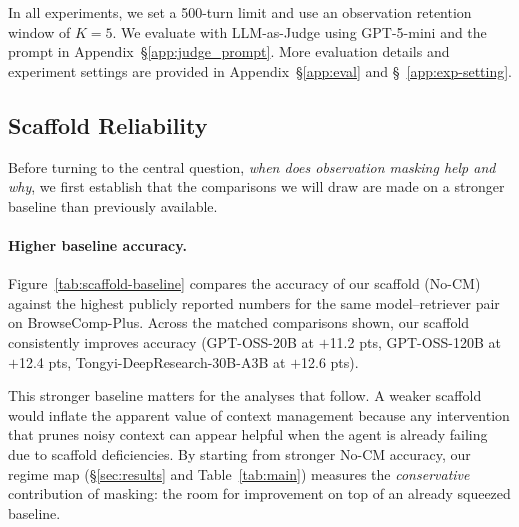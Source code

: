 In all experiments, we set a 500-turn limit and use an observation retention window of $K=5$. We evaluate with LLM-as-Judge using GPT-5-mini and the prompt in Appendix~\S\ref{app:judge_prompt}. More evaluation details and experiment settings are provided in Appendix~\S\ref{app:eval} and \S~\ref{app:exp-setting}.


\subsection{Scaffold Reliability}
\label{sec:scaffold-reliability}


Before turning to the central question, \textit{when does observation masking help and why}, we first establish that the comparisons we will draw are made on a stronger baseline than previously available.

\paragraph{Higher baseline accuracy.}
Figure~\ref{tab:scaffold-baseline} compares the accuracy of our scaffold
(No-CM) against the highest publicly reported numbers for the same model--retriever pair on BrowseComp-Plus. Across the matched comparisons shown, our scaffold consistently improves accuracy (GPT-OSS-20B at $+$11.2 pts, GPT-OSS-120B at $+$12.4 pts, Tongyi-DeepResearch-30B-A3B at $+$12.6 pts). 


This stronger baseline matters for the analyses that follow. A weaker scaffold would inflate the apparent value of context management because any intervention that prunes noisy context can appear helpful when the agent is already failing due to scaffold deficiencies. By starting from stronger No-CM accuracy, our regime map (\S\ref{sec:results} and Table~\ref{tab:main}) measures the \emph{conservative} contribution of masking: the room for improvement on top of an already squeezed baseline.

